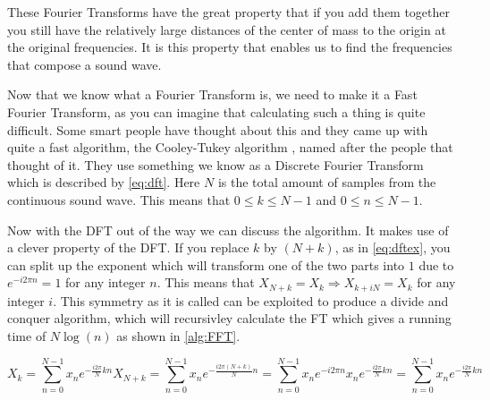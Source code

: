 These Fourier Transforms have the great property that if you add them together you still have the relatively large distances of the center of mass to the origin at the original frequencies. It 
is this property that enables us to find the frequencies that compose a sound wave. 

Now that we know what a Fourier Transform is, we need to make it a Fast Fourier Transform, as you can imagine that calculating such a thing is quite difficult. Some smart people have thought
about this and they came up with quite a fast algorithm, the Cooley-Tukey algorithm \cite{fft}, named after the people that thought of it. They use something we know as a Discrete Fourier 
Transform which is described by \autoref{eq:dft}. Here $N$ is the total amount of samples from the continuous sound wave. This means that $0 \leq k \leq N - 1$ and $0 \leq n \leq N - 1$.

Now with the DFT out of the way we can discuss the algorithm. It makes use of a clever property of the DFT. If you replace $k$ by $(N + k)$, as in \autoref{eq:dftex}, you can split up the 
exponent which will transform one of the two parts into $1$ due to $e^{-i2\pi n} = 1$ for any integer $n$. This means that $X_{N + k} = X_k \Rightarrow X_{k + iN} = X_k$ for any integer $i$. 
This symmetry as it is called can be exploited to produce a divide and conquer algorithm, which will recursivley calculate the FT which gives a running time of $N\log(n)$ as shown in 
\autoref{alg:FFT}.

\begin{subequations}
    \begin{equation}
        X_k = \sum_{n = 0}^{N - 1} x_ne^{-\frac{i2\pi}{N}kn}
        \label{eq:dft}
    \end{equation}
    \begin{equation}
        X_{N + k} = \sum_{n = 0}^{N - 1} x_ne^{-\frac{i2\pi(N + k)}{N}n} = \sum_{n = 0}^{N - 1} x_ne^{-i2\pi n}x_ne^{-\frac{i2\pi}{N}kn} = \sum_{n = 0}^{N - 1} x_ne^{-\frac{i2\pi}{N}kn}
        \label{eq:dftex}
    \end{equation}
\end{subequations}

\begin{algorithm}
     
    \label{alg:FFT}
\end{algorithm}

